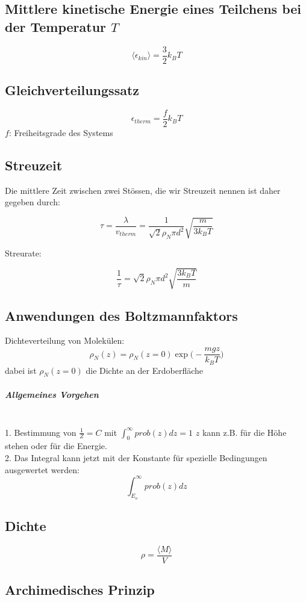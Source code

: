 \documentclass{article}
\begin{document}
\begin{multicols*}{3}
  \subsection{Mittlere kinetische Energie eines Teilchens bei der Temperatur $T$}

  $$\langle \epsilon _{kin}\rangle = \frac{3}{2}k_BT$$

  \subsection{Gleichverteilungssatz}

  $$\epsilon_{therm}=\frac{f}{2}k_BT$$
  $f$: Freiheitsgrade des Systems

  \subsection{Streuzeit}

  Die mittlere Zeit zwischen zwei Stössen, die wir Streuzeit nennen ist daher gegeben durch:

  $$\tau = \frac{\lambda}{v_{therm}}=\frac{1}{\sqrt{2}\rho _N \pi d^2}\sqrt{\frac{m}{3k_BT}}$$

  Streurate:

  $$\frac{1}{\tau}= \sqrt{2}\rho_N\pi d^2 \sqrt{\frac{3k_BT}{m}}$$

  \subsection{Anwendungen des Boltzmannfaktors}
  Dichteverteilung von Molekülen:
  $$\rho _N(z) = \rho _N(z=0)\exp\Big( -\frac{mgz}{k_BT} \Big)$$
  dabei ist $\rho _N(z=0)$ die Dichte an der Erdoberfläche

  \subparagraph{Allgemeines Vorgehen}
  \\1. Bestimmung von $\frac{1}{Z} = C$ mit $\int_0^\infty prob(z)dz = 1$ $z$ kann z.B. für die Höhe stehen oder für die Energie.
  \\2. Das Integral kann jetzt mit der Konstante für spezielle Bedingungen ausgewertet werden: $$\int_{E_{o}}^\infty prob(z)dz$$
  \subsection{Dichte}

  $$\rho = \frac{\langle M \rangle}{V}$$

  \subsection{Archimedisches Prinzip}


\end{multicols*}
\end{document}
